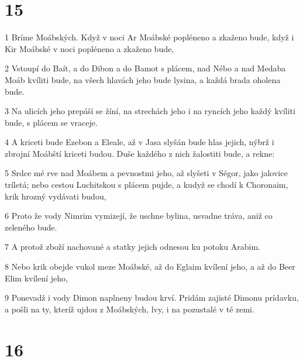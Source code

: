 \chapter{15}

\par 1 Bríme Moábských. Když v noci Ar Moábské popléneno a zkaženo bude, když i Kir Moábské v noci popléneno a zkaženo bude,
\par 2 Vstoupí do Baít, a do Dibon a do Bamot s plácem, nad Nébo a nad Medaba Moáb kvíliti bude, na všech hlavách jeho bude lysina, a každá brada oholena bude.
\par 3 Na ulicích jeho prepáší se žíní, na strechách jeho i na ryncích jeho každý kvíliti bude, s plácem se vraceje.
\par 4 A kriceti bude Ezebon a Eleale, až v Jasa slyšán bude hlas jejich, nýbrž i zbrojní Moábští kriceti budou. Duše každého z nich žalostiti bude, a rekne:
\par 5 Srdce mé rve nad Moábem a pevnostmi jeho, až slyšeti v Ségor, jako jalovice tríletá; nebo cestou Luchitskou s plácem pujde, a kudyž se chodí k Choronaim, krik hrozný vydávati budou,
\par 6 Proto že vody Nimrim vymizejí, že uschne bylina, usvadne tráva, aniž co zeleného bude.
\par 7 A protož zboží nachované a statky jejich odnesou ku potoku Arabim.
\par 8 Nebo krik obejde vukol meze Moábské, až do Eglaim kvílení jeho, a až do Beer Elim kvílení jeho,
\par 9 Ponevadž i vody Dimon naplneny budou krví. Pridám zajisté Dimonu prídavku, a pošli na ty, kteríž ujdou z Moábských, lvy, i na pozustalé v té zemi.

\chapter{16}

